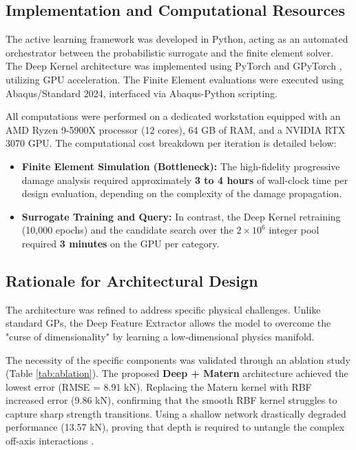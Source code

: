 \documentclass[
  preprint,
  12pt,
  a4paper
]{elsarticle}
\begin{document}
\subsection{Implementation and Computational Resources}
\label{sec:implementation}

The active learning framework was developed in Python, acting as an automated orchestrator between the probabilistic surrogate and the finite element solver. The Deep Kernel architecture was implemented using PyTorch \cite{paszke2019pytorch} and GPyTorch \cite{gardner2018gpytorch}, utilizing GPU acceleration. The Finite Element evaluations were executed using Abaqus/Standard 2024, interfaced via Abaqus-Python scripting.

All computations were performed on a dedicated workstation equipped with an AMD Ryzen 9-5900X processor (12 cores), 64 GB of RAM, and a NVIDIA RTX 3070 GPU. The computational cost breakdown per iteration is detailed below:

\begin{itemize}
    \item \textbf{Finite Element Simulation (Bottleneck):} The high-fidelity progressive damage analysis required approximately \textbf{3 to 4 hours} of wall-clock time per design evaluation, depending on the complexity of the damage propagation.
    \item \textbf{Surrogate Training and Query:} In contrast, the Deep Kernel retraining (10,000 epochs) and the candidate search over the $2 \times 10^6$ integer pool required \textbf{3 minutes} on the GPU per category.
\end{itemize}


\subsection{Rationale for Architectural Design}
\label{sec:ai_rationale}

The architecture was refined to address specific physical challenges. Unlike standard GPs, the Deep Feature Extractor allows the model to overcome the "curse of dimensionality" by learning a low-dimensional physics manifold. 

The necessity of the specific components was validated through an ablation study (Table \ref{tab:ablation}). The proposed \textbf{Deep + Matern} architecture achieved the lowest error (RMSE = 8.91 kN). Replacing the Matern kernel with RBF increased error (9.86 kN), confirming that the smooth RBF kernel struggles to capture sharp strength transitions. Using a shallow network drastically degraded performance (13.57 kN), proving that depth is required to untangle the complex off-axis interactions \cite{montufar2014number}.
\end{document}
